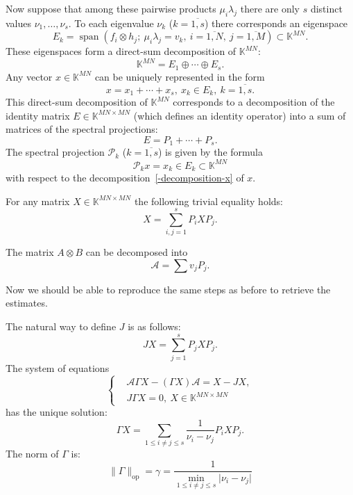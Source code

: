 \documentclass[a4paper]{article}
\theoremstyle{definition}
\begin{document}
Now suppose that among these pairwise products \( \mu_i \lambda_j \)
    there are only \( s \) distinct values \( \nu_1, \ldots, \nu_s \).
To each eigenvalue \( \nu_k \) (\( k{=}\overline{1,s} \)) there corresponds
    an eigenspace \[ E_k = \operatorname{span}(f_i\otimes h_j;\ \mu_i\lambda_j = v_k,\ i{=}\overline{1,N},\ j{=}\overline{1,M}) \subset \mathbb{K}^{MN}. \]
These eigenspaces form a direct-sum decomposition of \( \mathbb{K}^{MN} \):
    \[ \mathbb{K}^{MN} = E_1 \oplus \cdots \oplus E_s. \]
Any vector \( x\in\mathbb{K}^{MN} \) can be uniquely represented
    in the form
    \begin{equation}\label{-decomposition-x}
        x = x_1 + \cdots + x_s,\ x_k\in E_k,\ k=\overline{1,s}.
    \end{equation}
This direct-sum decomposition of \( \mathbb{K}^{MN} \)
    corresponds to a decomposition of the identity matrix \( E\in \mathbb{K}^{MN{\times}MN} \)
    (which defines an identity operator)
    into a sum of matrices of the spectral projections:
    \[
        E = P_1 + \cdots + P_s.
    \]
The spectral projection \( \mathcal{P}_k \) (\(k{=}\overline{1,s}\)) is given by the formula
    \[
        \mathcal{P}_k x = x_k \in E_k\subset \mathbb{K}^{MN}
    \]
    with respect to the decomposition~\eqref{-decomposition-x} of \( x \).

For any matrix \( X\in \mathbb{K}^{MN{\times}MN} \)
    the following trivial equality holds:
    \[
        X = \sum_{i,j=1}^s P_i X P_j.
    \]

The matrix \( A\otimes B \) can be decomposed into
    \[
        \mathcal{A} = \sum v_j P_j.
    \]

Now we should be able to reproduce the same steps as before
    to retrieve the estimates.

The natural way to define \( J \) is as follows:
    \[
        JX = \sum_{j=1}^s P_j X P_j.
    \]
The system of equations
    \[\left\{\begin{aligned}
        & \mathcal{A}\Gamma X - (\Gamma X) \mathcal{A} = X - JX, \\
        & J\Gamma X = 0,\ X\in \mathbb{K}^{MN{\times}MN}
    \end{aligned}\right.\]
    has the unique solution:
    \[
        \Gamma X = \sum_{1\leq i{\neq}j \leq s} \frac{1}{\nu_i-\nu_j} P_i X P_j.
    \]
    The norm of \( \Gamma \) is:
    \[
        \|\Gamma\|_{\mathrm{op}} = \gamma = \frac{1}{\min_{1\leq i{\neq}j\leq s}\lvert\nu_i - \nu_j\rvert}
    \]
\end{document}
